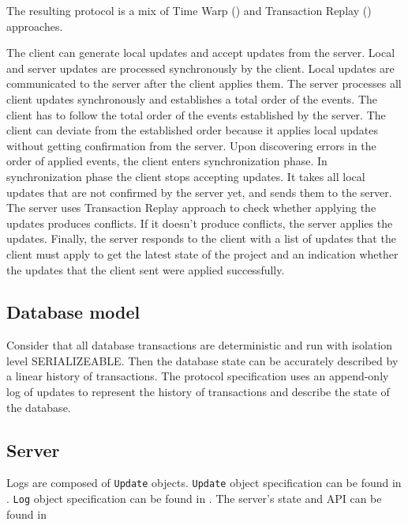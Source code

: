 \documentclass[a4paper, 11pt, oneside]{article}
\theoremstyle{definition}
\begin{document}
The resulting protocol is a mix of Time Warp () and Transaction Replay () approaches.

The client can generate local updates and accept updates from the server. Local and server updates are processed synchronously by the client. Local updates are communicated to the server after the client applies them. The server processes all client updates synchronously and establishes a total order of the events. The client has to follow the total order of the events established by the server. The client can deviate from the established order because it applies local updates without getting confirmation from the server. Upon discovering errors in the order of applied events, the client enters synchronization phase. In synchronization phase the client stops accepting updates. It takes all local updates that are not confirmed by the server yet, and sends them to the server. The server uses Transaction Replay approach to check whether applying the updates produces conflicts. If it doesn't produce conflicts, the server applies the updates. Finally, the server responds to the client with a list of updates that the client must apply to get the latest state of the project and an indication whether the updates that the client sent were applied successfully.

\subsection{Database model}

Consider that all database transactions are deterministic and run with isolation level SERIALIZEABLE. Then the database state can be accurately described by a linear history of transactions. 
The protocol specification uses an append-only log of updates to represent the history of transactions and describe the state of the database.

\subsection{Server}

Logs are composed of \verb|Update| objects. \verb|Update| object specification can be found in . \verb|Log| object specification can be found in . The server's state and API can be found in 
\end{document}
